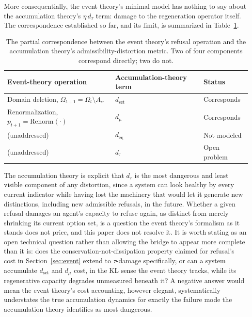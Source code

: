 \documentclass[11pt]{article}
\theoremstyle{plain}
\begin{document}
More consequentially, the event theory's minimal model has nothing to say about the accumulation theory's $\eta\, d_\tau$ term: damage to the regeneration operator itself. The correspondence established so far, and its limit, is summarized in Table~\ref{tab:correspondence}.

\begin{table}[h]
\centering
\begin{tabular}{lll}
\toprule
Event-theory operation & Accumulation-theory term & Status \\
\midrule
Domain deletion, $\Omega_{t+1} = \Omega_t \setminus A_\alpha$ & $d_{\mathrm{set}}$ & Corresponds \\
Renormalization, $p_{t+1} = \mathrm{Renorm}(\cdot)$ & $d_\mu$ & Corresponds \\
(unaddressed) & $d_{\mathrm{eq}}$ & Not modeled \\
(unaddressed) & $d_\tau$ & Open problem \\
\bottomrule
\end{tabular}
\caption{The partial correspondence between the event theory's refusal operation and the accumulation theory's admissibility-distortion metric. Two of four components correspond directly; two do not.}
\label{tab:correspondence}
\end{table}

The accumulation theory is explicit that $d_\tau$ is the most dangerous and least visible component of any distortion, since a system can look healthy by every current indicator while having lost the machinery that would let it generate new distinctions, including new admissible refusals, in the future. Whether a given refusal damages an agent's capacity to refuse again, as distinct from merely shrinking its current option set, is a question the event theory's formalism as it stands does not price, and this paper does not resolve it. It is worth stating as an open technical question rather than allowing the bridge to appear more complete than it is: does the conservation-not-dissipation property claimed for refusal's cost in Section~\ref{sec:event} extend to $\tau$-damage specifically, or can a system accumulate $d_{\mathrm{set}}$ and $d_\mu$ cost, in the KL sense the event theory tracks, while its regenerative capacity degrades unmeasured beneath it? A negative answer would mean the event theory's cost accounting, however elegant, systematically understates the true accumulation dynamics for exactly the failure mode the accumulation theory identifies as most dangerous.
\end{document}
